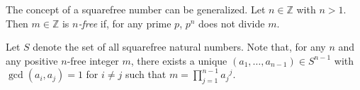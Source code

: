 \documentclass[12pt]{article}
\begin{document}
The concept of a squarefree number can be generalized.  Let $n \in \mathbb{Z}$ with $n>1$.  Then $m \in \mathbb{Z}$ is {\sl $n$-free\/} if, for any prime $p$, $p^n$ does not divide $m$.

Let $S$ denote the set of all squarefree natural numbers.  Note that, for any $n$ and any positive $n$-free integer $m$, there exists a unique $(a_1, \dots , a_{n-1}) \in S^{n-1}$ with $\gcd(a_i,a_j)=1$ for $i \neq j$ such that $\displaystyle m=\prod_{j=1}^{n-1} {a_j}^j$.
\end{document}
